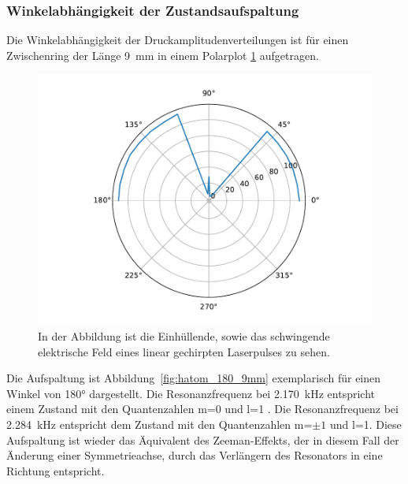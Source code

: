         \subsubsection*{Winkelabhängigkeit der Zustandsaufspaltung}
            Die Winkelabhängigkeit der Druckamplitudenverteilungen ist für einen Zwischenring der Länge \SI{9}{\milli\metre} in einem Polarplot \ref{fig:H_atom_resonanz_4} aufgetragen.  
            \FloatBarrier 
            \begin{figure}[ht]
                \centering
                \includegraphics[scale=0.5]{./pictures/H_atom_resonanz_4.pdf}
                \caption{In der Abbildung ist die Einhüllende, sowie das schwingende elektrische Feld eines linear gechirpten Laserpulses zu sehen.}
                \label{fig:H_atom_resonanz_4}
            \end{figure}
            \FloatBarrier
            Die Aufspaltung ist Abbildung~\ref{fig:hatom_180_9mm} exemplarisch für einen Winkel von 180° dargestellt. Die Resonanzfrequenz bei \SI{2.170}{\kilo\hertz} entspricht einem Zustand mit den 
            Quantenzahlen m=0 und l=1 . Die Resonanzfrequenz bei \SI{2.284}{\kilo\hertz} entspricht dem Zustand mit den Quantenzahlen m=$\pm 1$ und l=1. Diese Aufspaltung ist wieder das Äquivalent des
            Zeeman-Effekts, der in diesem Fall der Änderung einer Symmetrieachse, durch das Verlängern des Resonators in eine Richtung entspricht.
            \FloatBarrier
